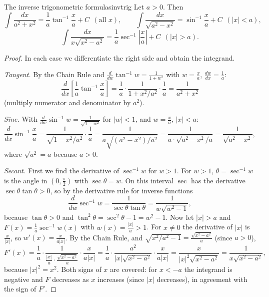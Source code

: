 \documentclass[11pt]{article}
\begin{document}
\begin{thm}{The inverse trigonometric formulas}{invtrig}
Let $a>0$. Then
\[\int\frac{dx}{a^2+x^2}=\frac1a\tan^{-1}\frac xa+C\ \ (\text{all }x),\qquad\int\frac{dx}{\sqrt{a^2-x^2}}=\sin^{-1}\frac xa+C\ \ (\lvert x\rvert<a),\]
\[\int\frac{dx}{x\sqrt{x^2-a^2}}=\frac1a\sec^{-1}\left\lvert\frac xa\right\rvert+C\ \ (\lvert x\rvert>a).\]
\end{thm}
\begin{proof}
In each case we differentiate the right side and obtain the integrand.

\emph{Tangent.} By the Chain Rule and $\frac{d}{dw}\tan^{-1}w=\frac1{1+w^2}$ with $w=\frac xa$, $\frac{dw}{dx}=\frac1a$:
\[\frac{d}{dx}\left[\frac1a\tan^{-1}\frac xa\right]=\frac1a\cdot\frac1{1+x^2/a^2}\cdot\frac1a=\frac1{a^2+x^2}\]
(multiply numerator and denominator by $a^2$).

\emph{Sine.} With $\frac{d}{dw}\sin^{-1}w=\frac1{\sqrt{1-w^2}}$ for $\lvert w\rvert<1$, and $w=\frac xa$, $\lvert x\rvert<a$:
\[\frac{d}{dx}\sin^{-1}\frac xa=\frac1{\sqrt{1-x^2/a^2}}\cdot\frac1a=\frac1{a\sqrt{(a^2-x^2)/a^2}}=\frac1{a\cdot\sqrt{a^2-x^2}/a}=\frac1{\sqrt{a^2-x^2}} ,\]
where $\sqrt{a^2}=a$ because $a>0$.

\emph{Secant.} First we find the derivative of $\sec^{-1}w$ for $w>1$. For $w>1$, $\theta=\sec^{-1}w$ is the angle in $\left(0,\frac\pi2\right)$ with $\sec\theta=w$. On this interval $\sec$ has the derivative $\sec\theta\tan\theta>0$, so by the derivative rule for inverse functions
\[\frac{d}{dw}\sec^{-1}w=\frac1{\sec\theta\tan\theta}=\frac1{w\sqrt{w^2-1}},\]
because $\tan\theta>0$ and $\tan^2\theta=\sec^2\theta-1=w^2-1$.
Now let $\lvert x\rvert>a$ and $F(x)=\frac1a\sec^{-1}w(x)$ with $w(x)=\frac{\lvert x\rvert}a>1$. For $x\ne0$ the derivative of $\lvert x\rvert$ is $\frac x{\lvert x\rvert}$, so $w'(x)=\frac{x}{a\lvert x\rvert}$. By the Chain Rule, and $\sqrt{x^2/a^2-1}=\frac{\sqrt{x^2-a^2}}a$ (since $a>0$),
\[F'(x)=\frac1a\cdot\frac1{\frac{\lvert x\rvert}a\cdot\frac{\sqrt{x^2-a^2}}a}\cdot\frac x{a\lvert x\rvert}=\frac1a\cdot\frac{a^2}{\lvert x\rvert\sqrt{x^2-a^2}}\cdot\frac{x}{a\lvert x\rvert}=\frac{x}{\lvert x\rvert^2\sqrt{x^2-a^2}}=\frac1{x\sqrt{x^2-a^2}},\]
because $\lvert x\rvert^2=x^2$. Both signs of $x$ are covered: for $x<-a$ the integrand is negative and $F$ decreases as $x$ increases (since $\lvert x\rvert$ decreases), in agreement with the sign of $F'$.
\end{proof}
\end{document}
